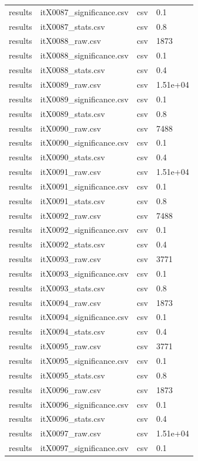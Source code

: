 \begin{landscape}
\begin{longtable}{p{}p{}p{}p{}}
results & itX0087\_significance.csv & csv & 0.1 \\
results & itX0087\_stats.csv & csv & 0.8 \\
results & itX0088\_raw.csv & csv & 1873 \\
results & itX0088\_significance.csv & csv & 0.1 \\
results & itX0088\_stats.csv & csv & 0.4 \\
results & itX0089\_raw.csv & csv & 1.51e+04 \\
results & itX0089\_significance.csv & csv & 0.1 \\
results & itX0089\_stats.csv & csv & 0.8 \\
results & itX0090\_raw.csv & csv & 7488 \\
results & itX0090\_significance.csv & csv & 0.1 \\
results & itX0090\_stats.csv & csv & 0.4 \\
results & itX0091\_raw.csv & csv & 1.51e+04 \\
results & itX0091\_significance.csv & csv & 0.1 \\
results & itX0091\_stats.csv & csv & 0.8 \\
results & itX0092\_raw.csv & csv & 7488 \\
results & itX0092\_significance.csv & csv & 0.1 \\
results & itX0092\_stats.csv & csv & 0.4 \\
results & itX0093\_raw.csv & csv & 3771 \\
results & itX0093\_significance.csv & csv & 0.1 \\
results & itX0093\_stats.csv & csv & 0.8 \\
results & itX0094\_raw.csv & csv & 1873 \\
results & itX0094\_significance.csv & csv & 0.1 \\
results & itX0094\_stats.csv & csv & 0.4 \\
results & itX0095\_raw.csv & csv & 3771 \\
results & itX0095\_significance.csv & csv & 0.1 \\
results & itX0095\_stats.csv & csv & 0.8 \\
results & itX0096\_raw.csv & csv & 1873 \\
results & itX0096\_significance.csv & csv & 0.1 \\
results & itX0096\_stats.csv & csv & 0.4 \\
results & itX0097\_raw.csv & csv & 1.51e+04 \\
results & itX0097\_significance.csv & csv & 0.1 \\

\end{longtable}
\end{landscape}
